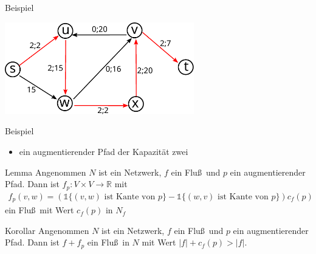 \documentclass[aspectratio=1610, 11pt]{beamer}
\newcommand\RR{\mathbb R}
\newcommand\bc[1]{\left({#1}\right)}
\newcommand{\vecone}{\mathbb{1}}
\begin{document}
\begin{frame}
\begin{overprint}
\begin{exampleblock}{Beispiel}
		\end{exampleblock}
		\begin{center} \includegraphics[height=40mm]{./images/flow3.pdf} \end{center}
		\begin{exampleblock}{Beispiel}
			\begin{itemize}
				\item ein augmentierender Pfad der Kapazit\"at zwei
			\end{itemize}
		\end{exampleblock}
		\begin{block}{Lemma}
			Angenommen $N$ ist ein Netzwerk, $f$ ein Flu\ss\ und $p$ ein augmentierender Pfad.
			Dann ist $f_p:V\times V\to\RR$ mit
			\begin{align*}
				f_p(v,w)=\bc{\vecone\{(v,w)\mbox{ ist Kante von }p\}-\vecone\{(w,v)\mbox{ ist Kante von }p\}}c_f(p)
			\end{align*}
			ein Flu\ss\ mit Wert $c_f(p)$ in $N_f$
		\end{block}
		\begin{block}{Korollar}
			Angenommen $N$ ist ein Netzwerk, $f$ ein Flu\ss\ und $p$ ein augmentierender Pfad.
			Dann ist $f+f_p$ ein Flu\ss\ in $N$ mit Wert $|f|+c_f(p)>|f|$.
		\end{block}
	\end{overprint}
\end{frame}
\end{document}

